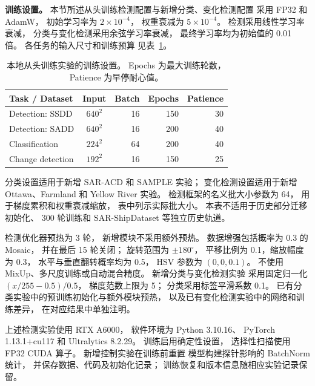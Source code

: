 \documentclass[journal]{IEEEtran}
\begin{document}
\textbf{训练设置。}
本节所述从头训练检测配置与新增分类、变化检测配置
采用 FP32 和 AdamW，
初始学习率为 $2\times10^{-4}$，
权重衰减为 $5\times10^{-4}$。
检测采用线性学习率衰减，
分类与变化检测采用余弦学习率衰减，
最终学习率均为初始值的 0.01 倍。
各任务的输入尺寸和训练预算
见表~\ref{tab:training_settings}。

\begin{table}[!t]
\centering
\small
\setlength{\tabcolsep}{4pt}
\caption{本地从头训练实验的训练设置。
Epochs 为最大训练轮数，Patience 为早停耐心值。}
\label{tab:training_settings}
\begin{tabular}{lcrrr}
\toprule
Task / Dataset & Input & Batch & Epochs & Patience \\
\midrule
Detection: SSDD
& $640^2$ & 16 & 150 & 30 \\
Detection: SADD
& $640^2$ & 16 & 200 & 40 \\
Classification
& $224^2$ & 64 & 200 & 40 \\
Change detection
& $192^2$ & 16 & 150 & 25 \\
\bottomrule
\end{tabular}
\smallskip
\begin{minipage}{\linewidth}
\footnotesize
分类设置适用于新增 SAR-ACD 和 SAMPLE 实验；
变化检测设置适用于新增 Ottawa、Farmland
和 Yellow River 实验。
检测框架的名义批大小参数为 64，
用于梯度累积和权重衰减缩放，
表中列示实际批大小。
本表不适用于历史部分迁移初始化、
300 轮训练和 SAR-ShipDataset 等独立历史轨道。
\end{minipage}
\end{table}

检测优化器预热为 3 轮，
新增模块不采用额外预热。
数据增强包括概率为 0.3 的 Mosaic，
并在最后 15 轮关闭；
旋转范围为 $\pm180^\circ$，
平移比例为 0.1，缩放幅度为 0.3，
水平与垂直翻转概率均为 0.5，
HSV 参数为 $(0,0,0.1)$。
不使用 MixUp、多尺度训练或自动混合精度。
新增分类与变化检测实验
采用固定归一化 $(x/255-0.5)/0.5$，
梯度范数上限为 5；
分类采用标签平滑系数 0.1。
已有分类实验中的预训练初始化与额外模块预热，
以及已有变化检测实验中的网络和训练差异，
在对应结果中单独注明。

上述检测实验使用 RTX A6000，
软件环境为 Python 3.10.16、
PyTorch 1.13.1+cu117 和 Ultralytics 8.2.29。
训练启用确定性设置，
选择性扫描使用 FP32 CUDA 算子。
新增控制实验在训练前重置
模型构建探针影响的 BatchNorm 统计，
并保存数据、代码及初始化记录；
训练恢复和版本信息随相应实验记录保留。
\end{document}
